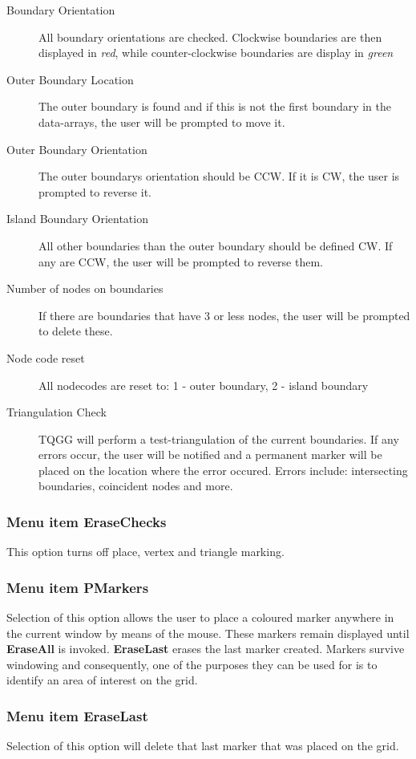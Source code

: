 \documentclass{article}
\begin{document}
\begin{description}
\item[Boundary Orientation] All boundary orientations are checked. Clockwise boundaries are then displayed in \emph{red}, while counter-clockwise boundaries are display in \emph{green}
\item[Outer Boundary Location] The outer boundary is found and if this is not the first boundary in the data-arrays, the user will be prompted to move it.
\item[Outer Boundary Orientation] The outer boundarys orientation should be CCW. If it is CW, the user is prompted to reverse it.
\item[Island Boundary Orientation] All other boundaries than the outer boundary should be defined CW. If any are CCW, the user will be prompted to reverse them.
\item[Number of nodes on boundaries] If there are boundaries that have 3 or less nodes, the user will be prompted to delete these.
\item[Node code reset] All nodecodes are reset to: 1 - outer boundary, 2 - island boundary
\item[Triangulation Check] TQGG will perform a test-triangulation of the current boundaries. If any errors occur, the user will be notified and a permanent marker will be placed on the location where the error occured. Errors include: intersecting boundaries, coincident nodes and more.
\end{description}

\subsubsection{Menu item EraseChecks}
This option turns off place, vertex and triangle marking.

\subsubsection{Menu item PMarkers}
Selection of this option allows the user to place a coloured marker anywhere in the current window by means of the mouse. These markers remain displayed until \textbf{EraseAll} is invoked. \textbf{EraseLast} erases the last marker created. Markers survive windowing and consequently, one of the purposes they can be used for is to identify an area of interest on the grid.

\subsubsection{Menu item EraseLast}
Selection of this option will delete that last marker that was placed on the grid.
\end{document}
